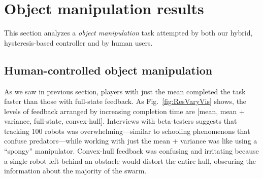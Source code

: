 
\section{Object manipulation results}\label{sec:exp}

This section analyzes a \emph{object manipulation} task attempted by both our hybrid, hysteresis-based controller and by human users.  

\subsection{Human-controlled object manipulation}



As we saw in previous section, players with just the mean completed the task faster than those with full-state feedback.  As Fig.~\ref{fig:ResVaryVis} shows, the levels of feedback arranged by increasing completion time are [mean, mean + variance, full-state, convex-hull].  Interviews with  beta-testers suggests that tracking 100 robots was overwhelming---similar to schooling phenomenons that confuse predators---while working with just the mean + variance was like using a ``spongy'' manipulator. Convex-hull feedback was confusing and irritating because a single robot left behind an obstacle would distort the entire hull, obscuring the information about the majority of the swarm.


